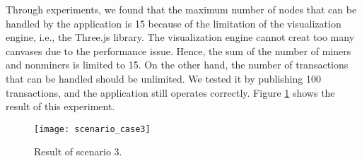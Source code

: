 Through experiments, we found that the maximum number of nodes that can be handled by the application is 15 because of the limitation of the visualization engine, i.e., the Three.js library. The visualization engine cannot creat too many canvases due to the performance issue. Hence, the sum of the number of miners and nonminers is limited to 15. On the other hand, the number of transactions that can be handled should be unlimited. We tested it by publishing 100 transactions, and the application still operates correctly. Figure \ref{fig:result of scenario 3} shows the result of this experiment.

\begin{figure}[htb]
    \centering
    \texttt{[image: scenario\_case3]}
    \caption{Result of scenario 3.}
    \label{fig:result of scenario 3}
\end{figure}

